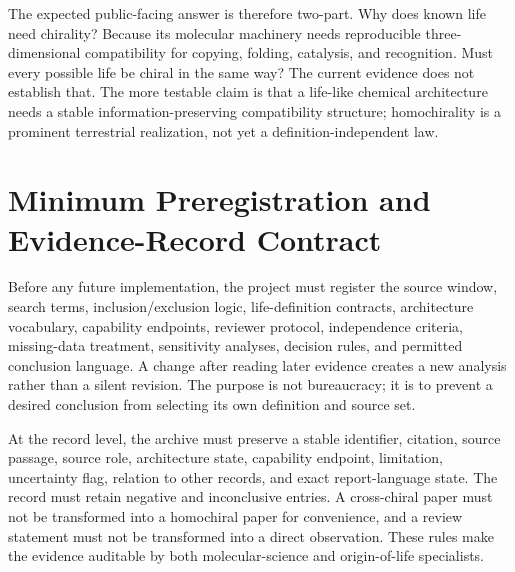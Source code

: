 \documentclass[conference]{IEEEtran}
\begin{document}
The expected public-facing answer is therefore two-part. Why does known life need chirality? Because its molecular machinery needs reproducible three-dimensional compatibility for copying, folding, catalysis, and recognition. Must every possible life be chiral in the same way? The current evidence does not establish that. The more testable claim is that a life-like chemical architecture needs a stable information-preserving compatibility structure; homochirality is a prominent terrestrial realization, not yet a definition-independent law.

\balance
\section{Minimum Preregistration and Evidence-Record Contract}

Before any future implementation, the project must register the source window, search terms, inclusion/exclusion logic, life-definition contracts, architecture vocabulary, capability endpoints, reviewer protocol, independence criteria, missing-data treatment, sensitivity analyses, decision rules, and permitted conclusion language. A change after reading later evidence creates a new analysis rather than a silent revision. The purpose is not bureaucracy; it is to prevent a desired conclusion from selecting its own definition and source set.

At the record level, the archive must preserve a stable identifier, citation, source passage, source role, architecture state, capability endpoint, limitation, uncertainty flag, relation to other records, and exact report-language state. The record must retain negative and inconclusive entries. A cross-chiral paper must not be transformed into a homochiral paper for convenience, and a review statement must not be transformed into a direct observation. These rules make the evidence auditable by both molecular-science and origin-of-life specialists.
\end{document}
